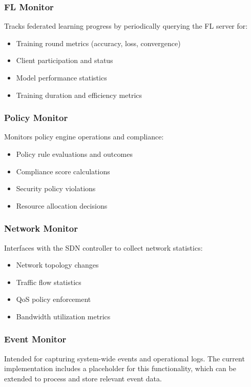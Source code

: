 \subsubsection{FL Monitor}
Tracks federated learning progress by periodically querying the FL server for:
\begin{itemize}
    \item Training round metrics (accuracy, loss, convergence)
    \item Client participation and status
    \item Model performance statistics
    \item Training duration and efficiency metrics
\end{itemize}

\subsubsection{Policy Monitor}
Monitors policy engine operations and compliance:
\begin{itemize}
    \item Policy rule evaluations and outcomes
    \item Compliance score calculations
    \item Security policy violations
    \item Resource allocation decisions
\end{itemize}

\subsubsection{Network Monitor}
Interfaces with the SDN controller to collect network statistics:
\begin{itemize}
    \item Network topology changes
    \item Traffic flow statistics
    \item QoS policy enforcement
    \item Bandwidth utilization metrics
\end{itemize}

\subsubsection{Event Monitor}
Intended for capturing system-wide events and operational logs. The current implementation includes a placeholder for this functionality, which can be extended to process and store relevant event data.

